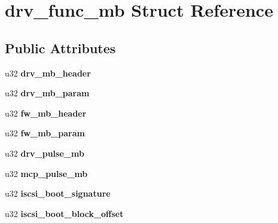 \hypertarget{structdrv__func__mb}{
\section{drv\_\-func\_\-mb Struct Reference}
\label{structdrv__func__mb}
}
\subsection*{Public Attributes}
\begin{DoxyCompactItemize}
\item 
\hypertarget{structdrv__func__mb_a21d1a9dab91336ba88ef94e6a64d45d7}{
u32 {\bfseries drv\_\-mb\_\-header}}
\label{structdrv__func__mb_a21d1a9dab91336ba88ef94e6a64d45d7}

\item 
\hypertarget{structdrv__func__mb_ae3cbf634e31ae7c8cd25f03bca4520cf}{
u32 {\bfseries drv\_\-mb\_\-param}}
\label{structdrv__func__mb_ae3cbf634e31ae7c8cd25f03bca4520cf}

\item 
\hypertarget{structdrv__func__mb_a0a4f2ee17fda9a8a997f75b372dcff64}{
u32 {\bfseries fw\_\-mb\_\-header}}
\label{structdrv__func__mb_a0a4f2ee17fda9a8a997f75b372dcff64}

\item 
\hypertarget{structdrv__func__mb_a79002429365e9a6a4bc1266554432158}{
u32 {\bfseries fw\_\-mb\_\-param}}
\label{structdrv__func__mb_a79002429365e9a6a4bc1266554432158}

\item 
\hypertarget{structdrv__func__mb_a2c1b6af92ffcb751460cc4334dc8437a}{
u32 {\bfseries drv\_\-pulse\_\-mb}}
\label{structdrv__func__mb_a2c1b6af92ffcb751460cc4334dc8437a}

\item 
\hypertarget{structdrv__func__mb_afd4442d37ea6df1082ccf8e395b6eca5}{
u32 {\bfseries mcp\_\-pulse\_\-mb}}
\label{structdrv__func__mb_afd4442d37ea6df1082ccf8e395b6eca5}

\item 
\hypertarget{structdrv__func__mb_a2e79d3d88af7c9b9a12e85084bd50428}{
u32 {\bfseries iscsi\_\-boot\_\-signature}}
\label{structdrv__func__mb_a2e79d3d88af7c9b9a12e85084bd50428}

\item 
\hypertarget{structdrv__func__mb_a472d19a2275b87224ae2150036f11eee}{
u32 {\bfseries iscsi\_\-boot\_\-block\_\-offset}}
\label{structdrv__func__mb_a472d19a2275b87224ae2150036f11eee}


\end{DoxyCompactItemize}
